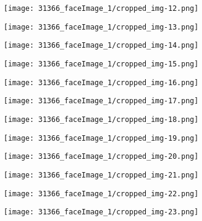 \begin{figure}
{\begin{subfigure}{0.09\textwidth}
\end{subfigure}
\begin{subfigure}{0.09\textwidth}
  \centering
  \texttt{[image: 31366\_faceImage\_1/cropped\_img-12.png]}
\end{subfigure}
\begin{subfigure}{0.09\textwidth}
  \centering
  \texttt{[image: 31366\_faceImage\_1/cropped\_img-13.png]}
\end{subfigure}
\begin{subfigure}{0.09\textwidth}
  \centering
  \texttt{[image: 31366\_faceImage\_1/cropped\_img-14.png]}
\end{subfigure}
\begin{subfigure}{0.09\textwidth}
  \centering
  \texttt{[image: 31366\_faceImage\_1/cropped\_img-15.png]}
\end{subfigure}
\begin{subfigure}{0.09\textwidth}
  \centering
  \texttt{[image: 31366\_faceImage\_1/cropped\_img-16.png]}
\end{subfigure}
\begin{subfigure}{0.09\textwidth}
  \centering
  \texttt{[image: 31366\_faceImage\_1/cropped\_img-17.png]}
\end{subfigure}
\begin{subfigure}{0.09\textwidth}
  \centering
  \texttt{[image: 31366\_faceImage\_1/cropped\_img-18.png]}
\end{subfigure}
\begin{subfigure}{0.09\textwidth}
  \centering
  \texttt{[image: 31366\_faceImage\_1/cropped\_img-19.png]}
\end{subfigure}
}
\parbox{\textwidth}{
\begin{subfigure}{0.09\textwidth}
  \centering
  \texttt{[image: 31366\_faceImage\_1/cropped\_img-20.png]}
\end{subfigure}
\begin{subfigure}{0.09\textwidth}
  \centering
  \texttt{[image: 31366\_faceImage\_1/cropped\_img-21.png]}
\end{subfigure}
\begin{subfigure}{0.09\textwidth}
  \centering
  \texttt{[image: 31366\_faceImage\_1/cropped\_img-22.png]}
\end{subfigure}
\begin{subfigure}{0.09\textwidth}
  \centering
  \texttt{[image: 31366\_faceImage\_1/cropped\_img-23.png]}

\end{subfigure}}
\end{figure}
